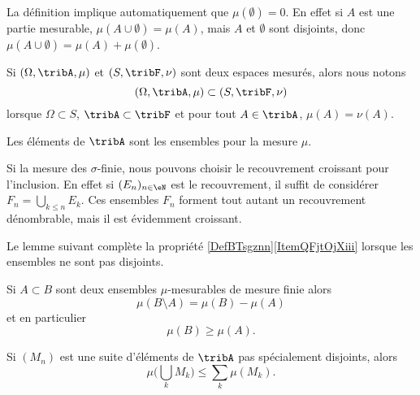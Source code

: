 \begin{remark}
    La définition implique automatiquement que \( \mu(\emptyset)=0\). En effet si \( A\) est une partie mesurable, \( \mu(A\cup \emptyset)=\mu(A)\), mais \( A\) et \( \emptyset\) sont disjoints, donc \( \mu(A\cup \emptyset)=\mu(A)+\mu(\emptyset)\).
\end{remark}

Si \( (\Omega,\tribA,\mu)\) et \( (S,\tribF,\nu)\) sont deux espaces mesurés, alors nous notons
\begin{equation}
    (\Omega,\tribA,\mu)\subset (S,\tribF,\nu)
\end{equation}
lorsque \( \Omega\subset S\), \( \tribA\subset\tribF\) et pour tout \( A\in\tribA\), \( \mu(A)=\nu(A)\).

\begin{definition}\label{DefHGsQxHB}
    Les éléments de \( \tribA\) sont les ensembles  pour la mesure \( \mu\).
\end{definition}

Si la mesure des \( \sigma\)-finie, nous pouvons choisir le recouvrement croissant pour l'inclusion. En effet si \( (E_n)_{n\in \eN}\) est le recouvrement, il suffit de considérer \( F_n=\bigcup_{k\leq n}E_k\). Ces ensembles \( F_n\) forment tout autant un recouvrement dénombrable, mais il est évidemment croissant.

Le lemme suivant complète la propriété \ref{DefBTsgznn}\ref{ItemQFjtOjXiii} lorsque les ensembles ne sont pas disjoints.
\begin{lemma} \label{LemPMprYuC}
    Si \( A\subset B\) sont deux ensembles \( \mu\)-mesurables de mesure finie alors
    \begin{equation}
        \mu(B\setminus A)=\mu(B)-\mu(A)
    \end{equation}
    et en particulier
    \begin{equation}
        \mu(B)\geq \mu(A).
    \end{equation}

    Si \( (M_n)\) est une suite d'éléments de \( \tribA\) pas spécialement disjoints, alors
    \begin{equation}\label{EqWWFooYPCTt}
        \mu\big( \bigcup_kM_k \big)\leq \sum_{k}\mu(M_k).
    \end{equation}
\end{lemma}


